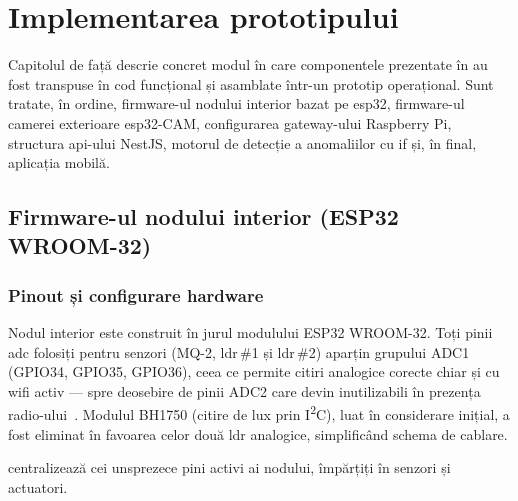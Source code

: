 \chapter{Implementarea prototipului}
\label{ch:implementare}

Capitolul de față descrie concret modul în care componentele prezentate în
 au fost transpuse în cod funcțional și asamblate
într-un prototip operațional.
Sunt tratate, în ordine, firmware-ul nodului interior bazat pe
\gls{esp32}, firmware-ul camerei exterioare \gls{esp32}-CAM, configurarea
gateway-ului Raspberry Pi, structura \gls{api}-ului NestJS, motorul de
detecție a anomaliilor cu \gls{if} și, în final, aplicația mobilă.

\section{Firmware-ul nodului interior (ESP32 WROOM-32)}
\label{sec:firmware-nod}

\subsection{Pinout și configurare hardware}
\label{sec:pinout}

Nodul interior este construit în jurul modulului ESP32 WROOM-32.
Toți pinii \gls{adc} folosiți pentru senzori (MQ-2, \gls{ldr}\,\#1 și
\gls{ldr}\,\#2) aparțin grupului ADC1 (GPIO34, GPIO35, GPIO36), ceea ce
permite citiri analogice corecte chiar și cu \gls{wifi} activ — spre
deosebire de pinii ADC2 care devin inutilizabili în prezența
radio-ului~\cite{espressif2023esp32}.
Modulul BH1750 (citire de lux prin I\textsuperscript{2}C), luat în
considerare inițial, a fost eliminat în favoarea celor două \gls{ldr}
analogice, simplificând schema de cablare.

 centralizează cei unsprezece pini activi ai
nodului, împărțiți în senzori și actuatori.

